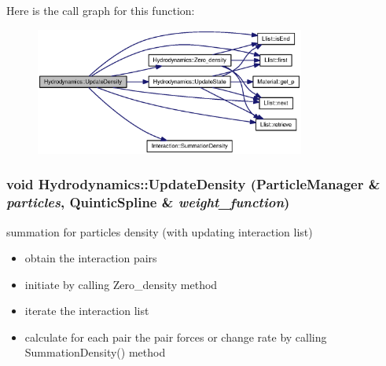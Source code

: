 Here is the call graph for this function:\nopagebreak
\begin{figure}[H]
\begin{center}
\leavevmode
\includegraphics[width=251pt]{classHydrodynamics_b6cab35a4d7adf70657ef16b9ec4dafd_cgraph}
\end{center}
\end{figure}
\hypertarget{classHydrodynamics_1818eb1f9044ae980e92c70146e51c5b}{
\subsubsection[{UpdateDensity}]{\setlength{\rightskip}{0pt plus 5cm}void Hydrodynamics::UpdateDensity ({\bf ParticleManager} \& {\em particles}, \/  {\bf QuinticSpline} \& {\em weight\_\-function})}}
\label{classHydrodynamics_1818eb1f9044ae980e92c70146e51c5b}


summation for particles density (with updating interaction list) 



\begin{itemize}
\item obtain the interaction pairs\end{itemize}


\begin{itemize}
\item initiate by calling Zero\_\-density method\end{itemize}


\begin{itemize}
\item iterate the interaction list\end{itemize}


\begin{itemize}
\item calculate for each pair the pair forces or change rate by calling SummationDensity() method\end{itemize}



